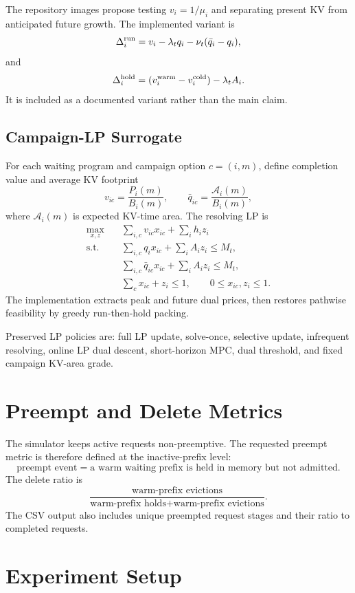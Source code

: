 \documentclass[11pt]{article}
\begin{document}
The repository images propose testing $v_i=1/\mu_i$ and separating present KV
from anticipated future growth.  The implemented variant is
\[
    \Delta_i^{\rm run}
    =
    v_i-\lambda_t q_i-\nu_t(\bar q_i-q_i),
\]
and
\[
    \Delta_i^{\rm hold}
    =
    (v_i^{\rm warm}-v_i^{\rm cold})-\lambda_tA_i.
\]
It is included as a documented variant rather than the main claim.

\subsection{Campaign-LP Surrogate}

For each waiting program and campaign option $c=(i,m)$, define completion value
and average KV footprint
\[
    v_{ic}=\frac{P_i(m)}{B_i(m)},\qquad
    \bar q_{ic}=\frac{\mathcal A_i(m)}{B_i(m)},
\]
where $\mathcal A_i(m)$ is expected KV-time area.  The resolving LP is
\[
\begin{aligned}
\max_{x,z}\quad
&\sum_{i,c}v_{ic}x_{ic}+\sum_i h_i z_i\\
\text{s.t.}\quad
&\sum_{i,c}q_i x_{ic}+\sum_i A_i z_i\le M_t,\\
&\sum_{i,c}\bar q_{ic}x_{ic}+\sum_i A_i z_i\le M_t,\\
&\sum_c x_{ic}+z_i\le1,\qquad 0\le x_{ic},z_i\le1.
\end{aligned}
\]
The implementation extracts peak and future dual prices, then restores
pathwise feasibility by greedy run-then-hold packing.

Preserved LP policies are: full LP update, solve-once, selective update,
infrequent resolving, online LP dual descent, short-horizon MPC, dual
threshold, and fixed campaign KV-area grade.

\section{Preempt and Delete Metrics}

The simulator keeps active requests non-preemptive.  The requested preempt
metric is therefore defined at the inactive-prefix level:
\[
    \text{preempt event} =
    \text{a warm waiting prefix is held in memory but not admitted}.
\]
The delete ratio is
\[
    \frac{\text{warm-prefix evictions}}
    {\text{warm-prefix holds}+\text{warm-prefix evictions}}.
\]
The CSV output also includes unique preempted request stages and their ratio to
completed requests.

\section{Experiment Setup}
\end{document}
